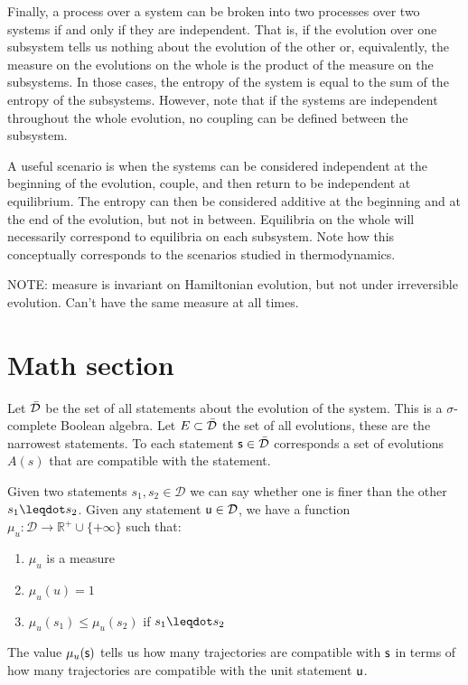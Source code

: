 \documentclass[letterpaper]{article}
\begin{document}
Finally, a process over a system can be broken into two processes over two systems if and only if they are independent. That is, if the evolution over one subsystem tells us nothing about the evolution of the other or, equivalently, the measure on the evolutions on the whole is the product of the measure on the subsystems. In those cases, the entropy of the system is equal to the sum of the entropy of the subsystems. However, note that if the systems are independent throughout the whole evolution, no coupling can be defined between the subsystem.

A useful scenario is when the systems can be considered independent at the beginning of the evolution, couple, and then return to be independent at equilibrium. The entropy can then be considered additive at the beginning and at the end of the evolution, but not in between. Equilibria on the whole will necessarily correspond to equilibria on each subsystem. Note how this conceptually corresponds to the scenarios studied in thermodynamics.


NOTE: measure is invariant on Hamiltonian evolution, but not under irreversible evolution. Can't have the same measure at all times.


\section{Math section}

Let $\tdomain$ be the set of all statements about the evolution of the system. This is a $\sigma$-complete Boolean algebra. Let $E \subset \tdomain$ the set of all evolutions, these are the narrowest statements. To each statement $\stmt \in \tdomain$ corresponds a set of evolutions $A(s)$ that are compatible with the statement.

Given two statements $s_1, s_2 \in \mathcal{D}$ we can say whether one is finer than the other $s_1 \finer s_2$. Given any statement $\stmt[u] \in \mathcal{D}$, we have a function $\mu_u : \mathcal{D} \to \mathbb{R}^+\cup \{+\infty \}$ such that:
\begin{enumerate}
	\item $\mu_u$ is a measure
	\item $\mu_u(u) = 1$
	\item $\mu_u(s_1) \leq \mu_u(s_2)$ if $s_1 \finer s_2$
\end{enumerate}
The value $\mu_u(\stmt)$ tells us how many trajectories are compatible with $\stmt$ in terms of how many trajectories are compatible with the unit statement $\stmt[u]$.
\end{document}
